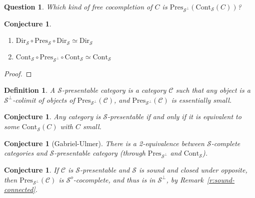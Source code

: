 \documentclass{article}
\newcommand{\Cont}[1]{\text{Cont}_{#1}}
\newcommand{\Dir}[1]{\text{Dir}_{#1}}
\newcommand{\Pres}[1]{\text{Pres}_{#1}}
\newcommand{\Set}{\text{Set}}
\newtheorem{definition}[theorem]{Definition}
\newtheorem{conjecture}[theorem]{Conjecture}
\newtheorem{question}[theorem]{Question}
\begin{document}
  \begin{question}
    Which kind of free cocompletion of $C$ is
    $\Pres{\mathcal{S}^\bot}(\Cont{\mathcal{S}}(C))$?
  \end{question}
  \begin{conjecture}
    \begin{enumerate}
    \item 
      $\Dir{\mathcal{S}} \circ \Pres{\mathcal{S}} \circ \Dir{\mathcal{S}} \simeq \Dir{\mathcal{S}} $
      \item
      $\Cont{\mathcal{S}} \circ \Pres{\mathcal{S}^\bot} \circ \Cont{\mathcal{S}} \simeq \Cont{\mathcal{S}} $
    \end{enumerate}
  \end{conjecture}
  \begin{proof}
  \end{proof}
  \begin{definition}
    A $\mathcal{S}$-presentable category is a category $\mathcal{C}$ such that any object
    is a $\mathcal{S}^\bot$-colimit of objects of $\Pres{\mathcal{S}^\bot}(\mathcal{C})$, and
    $\Pres{\mathcal{S}^\bot}(\mathcal{C})$ is essentially small.
  \end{definition}
  \begin{conjecture}
    Any category is $\mathcal{S}$-presentable if and only if it is equivalent to some
    $\Cont{\mathcal{S}}(C)$ with $C$ small.
  \end{conjecture}
  \begin{conjecture}[Gabriel-Ulmer] 
    There is a 2-equivalence between $\mathcal{S}$-complete categories and 
    $\mathcal{S}$-presentable category (through $\Pres{\mathcal{S}^\bot}$ and $\Cont{\mathcal{S}}$).
  \end{conjecture}
  \begin{conjecture}
    If $\mathcal{C}$ is $\mathcal{S}$-presentable and $\mathcal{S}$ is sound and
    closed under opposite,
    then $\Pres{\mathcal{S}^\bot}(\mathcal{C})$ is
    $\mathcal{S}^o$-cocomplete, and thus is in $\mathcal{S}^\bot$, by Remark~\ref{r:sound-connected}.
  \end{conjecture}
\end{document}
